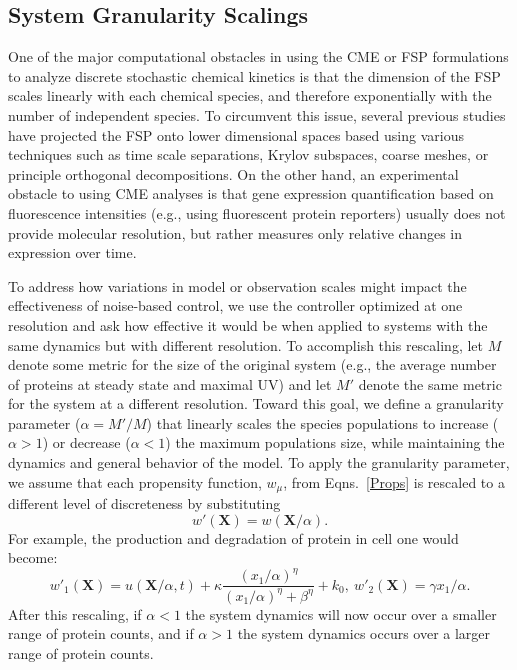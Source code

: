 \documentclass[12pt]{article}
\begin{document}
\subsection{System Granularity Scalings}
One of the major computational obstacles in using the CME or FSP formulations to analyze discrete stochastic chemical kinetics is that the dimension of the FSP scales linearly with each chemical species, and therefore exponentially with the number of independent species. To circumvent this issue, several previous studies have projected the FSP onto lower dimensional spaces based using various techniques such as time scale separations\cite{Peles2006}, Krylov subspaces\cite{Macnemara&Sidje?}, coarse meshes\cite{Munsky2008IEEE,Tapia2012CDC}, or principle orthogonal decompositions\cite{Vo2019}.
On the other hand, an experimental obstacle to using CME analyses is that gene expression quantification based on fluorescence intensities (e.g., using fluorescent protein reporters) usually does not provide molecular resolution, but rather measures only relative changes in expression over time.

To address how variations in model or observation scales might impact the effectiveness of noise-based control, we use the controller optimized at one resolution and ask how effective it would be when applied to systems with the same dynamics but with different resolution. 
To accomplish this rescaling, let $M$ denote some metric for the size of the original system (e.g., the average number of proteins at steady state and maximal UV) and let $M'$ denote the same metric for the system at a different resolution.  
Toward this goal, we define a granularity parameter ($\alpha=M'/M$) that linearly scales the species populations to increase ($\alpha>1$) or decrease ($\alpha<1$) the maximum populations size, while maintaining the dynamics and general behavior of the model. To apply the granularity parameter, we assume that each propensity function, $w_{\mu}$, from Eqns.\ \ref{Props} is rescaled to a different level of discreteness by substituting
\begin{equation}
w'(\mathbf{X})=w(\mathbf{X}/\alpha).
\end{equation}
For example, the production and degradation of protein in cell one would become:
\begin{equation}
w'_1(\mathbf{X}) = u(\mathbf{X}/\alpha,t)  + \kappa \frac{(x_1/\alpha)^\eta}{(x_1/\alpha)^{\eta}+\beta^{\eta}} + k_0,\ w'_2(\mathbf{X}) = \gamma x_1/\alpha.
\end{equation}
After this rescaling, if $\alpha<1 $ the system dynamics will now occur over a smaller range of protein counts, and if $\alpha >1$ the system dynamics occurs over a larger range of protein counts. 
\end{document}

